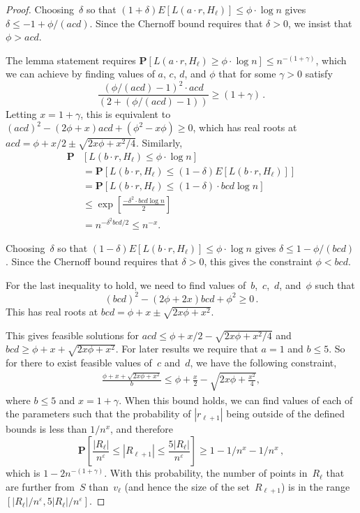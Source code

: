 \documentclass[11pt]{article}
\newcommand{\eps}{\ensuremath{\varepsilon}}
\begin{document}
\begin{proof}
\noindent
Choosing~$\delta$ so that
$(1+\delta)E[L(a\cdot r, H_\ell)] \leq
\phi\cdot\log n$
gives $\delta \leq -1+\phi/(a c d)$. 
Since the Chernoff bound requires that $\delta>0$,
we insist that $\phi>acd$.

The lemma statement requires $\mathbf{P}[L(a\cdot r, H_\ell)\geq \phi\cdot\log n ]\leq n^{-(1+\gamma)}$, which we can achieve by finding values
of $a$, $c$, $d$, and  $\phi$ that for some $\gamma > 0$ satisfy
$$\frac{({\phi}/(a c d)-1)^2\cdot acd}{(2+({\phi}/(a c d)-1))}\geq
(1+\gamma)\,.$$
Letting $x = 1+\gamma$, this is equivalent to $(acd)^2-(2\phi+x)acd+(\phi^2-x\phi)\geq 0$, which has real roots at $acd = \phi+x/2 \pm\sqrt{2x\phi+x^2/4}$.
Similarly, 
\begin{align*}
\mathbf{P}&[L(b\cdot r, H_\ell)\leq \phi\cdot\log n]\\[2pt]
  &= \mathbf{P}[L(b\cdot r, H_\ell)\leq(1-\delta)E[L(b\cdot r, H_\ell)]] \\[2pt]
    &= \mathbf{P}[L(b\cdot r, H_\ell)\leq(1-\delta)\cdot bcd\log n ]\\[2pt]
 & \leq \exp\left[\frac{-\delta^2\cdot bcd\log n }{2}\right] \\[2pt]
   & = n^{-{\delta^2 bcd}/{2}}  \leq n^{-x}.
\end{align*}
\vspace{-2mm}
  
  
Choosing~$\delta$ so that $(1-\delta)E[L(b\cdot r, H_\ell)] \leq
\phi\cdot\log n$ gives $\delta \leq 1-\phi/(b c d)$.
 Since the Chernoff bound requires that $\delta>0$, this gives the
constraint $\phi<bcd$.

For the last inequality to hold,
we need to find values of~$b$,~$c$,~$d$, and~$\phi$ such that  
$$(bcd)^2-(2\phi+2x)bcd+\phi^2\geq 0\,.$$
This has real roots at $bcd = \phi+x\pm\sqrt{2x\phi+x^2}$.

This gives feasible solutions for $acd \leq \phi+x/2 -\sqrt{2x\phi+x^2/4}$ and $bcd \geq \phi+x+\sqrt{2x\phi+x^2}$.
For later results we require that $a=1$ and $b\leq 5$. 
So for there to exist feasible values of~$c$ and~$d$, we have the following constraint,
\begin{align}\label{eqn:bound}
\frac{\phi+x+\sqrt{2x\phi+x^2}}{b} \leq    \phi+\frac x 2 -\sqrt{2x\phi+\frac{x^2}{4}},
\end{align}
where $b\leq 5$ and $x =  1+\gamma$.
When this bound holds, we can find values of each of the parameters such that the probability of $|r_{\ell+1}|$ being outside of the defined bounds is less than $1/n^x$, and 
therefore 
$$\mathbf{P}\left[\frac{|R_\ell|}{n^{\eps}}\leq
|R_{\ell+1}|\leq\frac{5|R_\ell|}{n^{\eps}}\right]\geq 1-1/n^{x}-1/n^{x}\,,
$$
which is $1-{2}n^{-(1+\gamma)}$.
With this probability,
the number of points in~$R_\ell$ that are further from~$S$ than~$v_\ell$
(and hence the size of the set~$R_{\ell+1}$)
is in the range $[{|R_\ell|}/{n^{\eps}},{5|R_\ell|}/{n^{\eps}}]$.
\end{proof}
\end{document}
